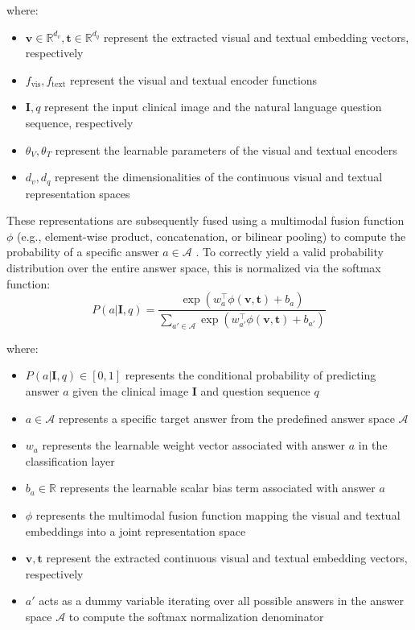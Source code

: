 where:
\begin{itemize}
\item $\mathbf{v} \in \mathbb{R}^{d_v}, \mathbf{t} \in \mathbb{R}^{d_q}$ represent the extracted visual and textual embedding vectors, respectively
\item $f_{\text{vis}}, f_{\text{text}}$ represent the visual and textual encoder functions
\item $\mathbf{I}, q$ represent the input clinical image and the natural language question sequence, respectively
\item $\theta_V, \theta_T$ represent the learnable parameters of the visual and textual encoders
\item $d_v, d_q$ represent the dimensionalities of the continuous visual and textual representation spaces
\end{itemize}

These representations are subsequently fused using a multimodal fusion function $\phi$ (e.g., element-wise product, concatenation, or bilinear pooling) to compute the probability of a specific answer $a \in \mathcal{A}$ \cite{wu2017vqa-survey}. To correctly yield a valid probability distribution over the entire answer space, this is normalized via the softmax function\cite{benyounes2017mutan}:
\begin{equation}
P(a|\mathbf{I},q) = \frac{\exp(w_{a}^{\top}\phi(\mathbf{v},\mathbf{t}) + b_{a})}{\sum_{a'\in\mathcal{A}} \exp(w_{a'}^{\top}\phi(\mathbf{v},\mathbf{t}) + b_{a'})}
\end{equation}

where:
\begin{itemize}
\item $P(a|\mathbf{I},q) \in [0,1]$ represents the conditional probability of predicting answer $a$ given the clinical image $\mathbf{I}$ and question sequence $q$
\item $a \in \mathcal{A}$ represents a specific target answer from the predefined answer space $\mathcal{A}$
\item $w_{a}$ represents the learnable weight vector associated with answer $a$ in the classification layer
\item $b_{a} \in \mathbb{R}$ represents the learnable scalar bias term associated with answer $a$
\item $\phi$ represents the multimodal fusion function mapping the visual and textual embeddings into a joint representation space
\item $\mathbf{v}, \mathbf{t}$ represent the extracted continuous visual and textual embedding vectors, respectively
\item $a'$ acts as a dummy variable iterating over all possible answers in the answer space $\mathcal{A}$ to compute the softmax normalization denominator
\end{itemize}


